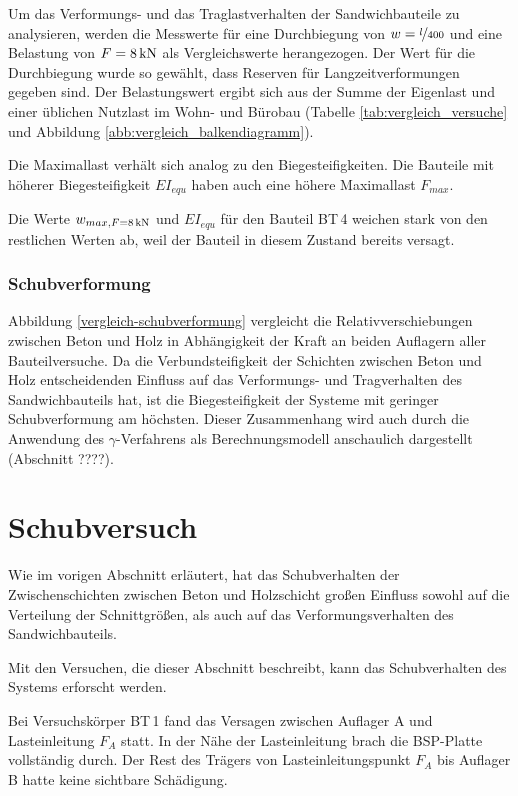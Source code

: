 Um das Verformungs- und das Traglastverhalten der Sandwichbauteile zu analysieren, werden die Messwerte für eine Durchbiegung von $w=\nicefrac{l}{400}$ und eine Belastung von $F=\unit[8]{kN}$ als Vergleichswerte herangezogen. Der Wert für die Durchbiegung wurde so gewählt, dass Reserven für Langzeitverformungen gegeben sind. Der Belastungswert ergibt sich aus der Summe der Eigenlast und einer üblichen Nutzlast im Wohn- und Bürobau (Tabelle \ref{tab:vergleich_versuche} und Abbildung \ref{abb:vergleich_balkendiagramm}).

Die Maximallast verhält sich analog zu den Biegesteifigkeiten. Die Bauteile mit höherer Biegesteifigkeit $EI_{equ}$ haben auch eine höhere Maximallast $F_{max}$. 

Die Werte $w_{max, F=\unit[8]{kN}}$ und $EI_{equ}$ für den Bauteil BT\,4 weichen stark von den restlichen Werten ab, weil der Bauteil in diesem Zustand bereits versagt.

\subsubsection{Schubverformung}
Abbildung \ref{vergleich-schubverformung} vergleicht die Relativverschiebungen zwischen Beton und Holz in Abhängigkeit der Kraft an beiden Auflagern aller Bauteilversuche. Da die Verbundsteifigkeit der Schichten zwischen Beton und Holz entscheidenden Einfluss auf das Verformungs- und Tragverhalten des Sandwichbauteils hat, ist die Biegesteifigkeit der Systeme mit geringer Schubverformung am höchsten.
Dieser Zusammenhang wird auch durch die Anwendung des $\gamma$-Verfahrens als Berechnungsmodell anschaulich dargestellt (Abschnitt ????). 

\clearpage
\section{Schubversuch}
\label{abs:schubversuch}

Wie im vorigen Abschnitt erläutert, hat das Schubverhalten der Zwischenschichten zwischen Beton und Holzschicht großen Einfluss sowohl auf die Verteilung der Schnittgrößen, als auch auf das Verformungsverhalten des Sandwichbauteils.

Mit den Versuchen, die dieser Abschnitt beschreibt, kann das Schubverhalten des Systems erforscht werden.

Bei Versuchskörper BT\,1 fand das Versagen zwischen Auflager A und Lasteinleitung $F_A$ statt. In der Nähe der Lasteinleitung brach die BSP-Platte vollständig durch. Der Rest des Trägers von Lasteinleitungspunkt $F_A$ bis Auflager B hatte keine sichtbare Schädigung.

